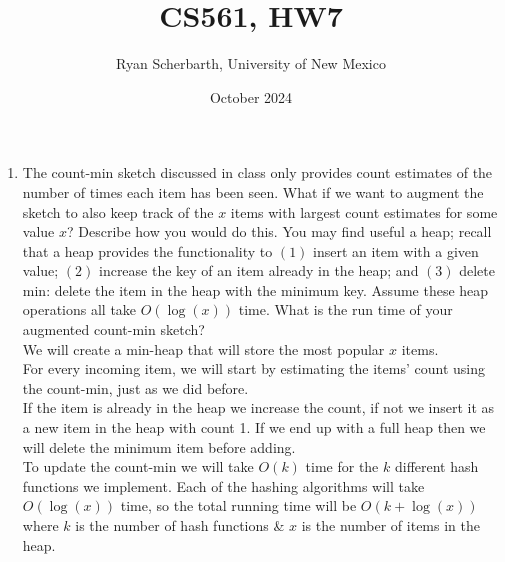 \documentclass{article}
\title{CS561, HW7}
\author{Ryan Scherbarth, University of New Mexico}
\date{October 2024}
\begin{document}
\maketitle

\begin{enumerate}

\item The count-min sketch discussed in class only provides count estimates of the number of times each item has been seen. What if we want to augment the sketch to also keep track of the $x$ items with largest count estimates for some value $x$? Describe how you would do this. You may find useful a heap; recall that a heap provides the functionality to $(1)$ insert an item with a given value; $(2)$ increase the key of an item already in the heap; and $(3)$ delete min: delete the item in the heap with the minimum key. Assume these heap operations all take $O(\log(x))$ time. What is the run time of your augmented count-min sketch? \\

We will create a min-heap that will store the most popular $x$ items. \\
\newline 
For every incoming item, we will start by estimating the items' count using the count-min, just as we did before.  \\
\newline 
If the item is already in the heap we increase the count, if not we insert it as a new item in the heap with count 1. If we end up with a full heap then we will delete the minimum item before adding. \\
\newline 
To update the count-min we will take $O(k)$ time for the $k$ different hash functions we implement. Each of the hashing algorithms will take $O(\log(x))$ time, so the total running time will be $O(k + \log(x))$ where $k$ is the number of hash functions \& $x$ is the number of items in the heap. \\
\newline














\end{enumerate}
\end{document}
